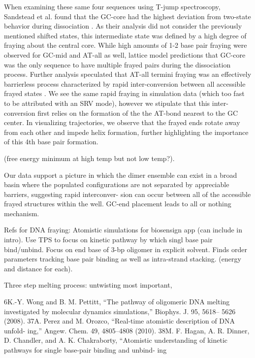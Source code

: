 \documentclass[journal=jpcbfk,manuscript=article]{achemso}
\begin{document}
When examining these same four sequences using T-jump spectroscopy, Sandstead et al. found that the GC-core had the highest deviation from two-state behavior during dissociation \citep{Sanstead2016}. As their analysis did not consider the previously mentioned shifted states, this intermediate state was defined by a high degree of fraying about the central core. While high amounts of 1-2 base pair fraying were observed for GC-mid and AT-all as well, lattice model predictions that GC-core was the only sequence to have multiple frayed pairs during the dissociation process. Further analysis speculated that AT-all termini fraying was an effectively barrierless process characterized by rapid inter-conversion between all accessible frayed states \citep{Sanstead2018DirectDehybridization}. We see the same rapid fraying in simulation data (which too fast to be attributed with an SRV mode), however we stipulate that this inter-conversion first relies on the formation of the the AT-bond nearest to the GC center. In visualizing trajectories, we observe that the frayed ends rotate away from each other and impede helix formation, further highlighting the importance of this 4th base pair formation.

(free energy minimum at high temp but not low temp?).


\citep{Sanstead2018DirectDehybridization} Our data support a picture in which the dimer ensemble can exist in a broad basin where the populated configurations are not separated by appreciable barriers, suggesting rapid interconver- sion can occur between all of the accessible frayed structures within the well. GC-end placement leads to all or nothing mechanism.


Refs for DNA fraying:
\citep{Hagan2003AtomisticDNA} Atomistic simulations for biosensign app (can include in intro). Use TPS to focus on kinetic pathway by which singl base pair bind/unbind. Focus on end base of 3-bp oligomer in explicit solvent. Finds order parameters tracking base pair binding as well as intra-strand stacking. (energy and distance for each). 

\citep{Wong2008TheSimulations} Three step melting process: untwisting most important,

6K.-Y. Wong and B. M. Pettitt, “The pathway of oligomeric DNA melting investigated by molecular dynamics simulations,” Biophys. J. 95, 5618– 5626 (2008).
37A. Perez and M. Orozco, “Real-time atomistic description of DNA unfold- ing,” Angew. Chem. 49, 4805–4808 (2010).
38M. F. Hagan, A. R. Dinner, D. Chandler, and A. K. Chakraborty, “Atomistic understanding of kinetic pathways for single base-pair binding and unbind- ing
\end{document}
